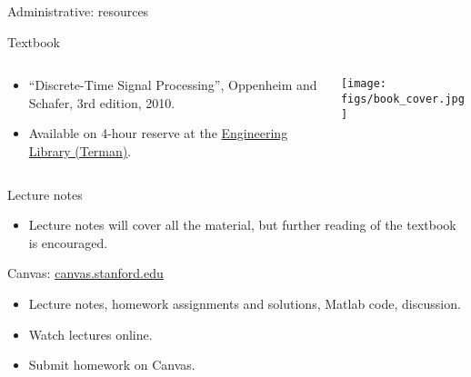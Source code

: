 \documentclass[10pt, aspectratio=169]{beamer}
\begin{document}
%
\begin{frame}{Administrative: resources}
\begin{block}{Textbook}
\begin{columns}[t]
	\begin{column}{0.8\textwidth}
		\begin{itemize}
			\item ``Discrete-Time Signal Processing'', Oppenheim and Schafer, 3rd edition, 2010.
			\item Available on 4-hour reserve at the \href{https://campus-map.stanford.edu/?id=04-080&lat=37.42787956&lng=-122.17429865&zoom=17&srch=engineeri}{Engineering Library (Terman)}.
		\end{itemize}
	\end{column}
	\begin{column}{0.25\textwidth}  %
		\vspace{-1cm}
		\begin{center}
			\texttt{[image: figs/book\_cover.jpg]}
		\end{center}
	\end{column}
\end{columns}
\end{block}
\vspace{-0.5cm}
\begin{block}{Lecture notes}
	\begin{itemize}
		\item Lecture notes will cover all the material, but further reading of the textbook is encouraged.
	\end{itemize}
\end{block}

\begin{block}{Canvas: \href{https://canvas.stanford.edu}{canvas.stanford.edu}}
	\begin{itemize}
		\item Lecture notes, homework assignments and solutions, Matlab code, discussion.
		\item Watch lectures online.
		\item Submit homework on Canvas.
	\end{itemize}
\end{block}

\end{frame}
\end{document}
